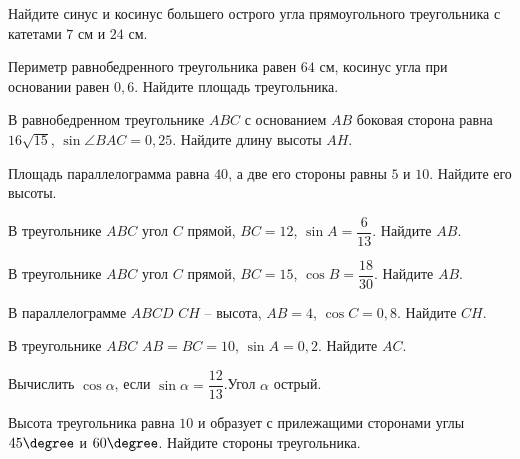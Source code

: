 \begin{class}[number=4]
\begin{listofex}[resume]
		\item Найдите синус и косинус  большего острого угла прямоугольного треугольника с катетами \( 7 \) см и \( 24  \) см.
		\item Периметр равнобедренного треугольника равен \( 64 \) см, косинус угла при основании равен \( 0,6 \). Найдите площадь треугольника.
		\item В равнобедренном треугольнике \( ABC \) с основанием \( AB \) боковая сторона равна \( 16\sqrt{15} \),  \( \sin\angle BAC=0,25 \). Найдите длину высоты \( AH \).
		\item Площадь параллелограмма равна \( 40 \), а две его стороны равны \( 5  \) и \( 10 \). Найдите его высоты.
	\end{listofex}
\end{class}

\begin{homework}[number=2]
	\begin{listofex}
		\item В треугольнике \( ABC \) угол \( C \) прямой, \( BC=12 \), \( \sin A=\dfrac{6}{13} \). Найдите \( AB \).
		\item В треугольнике \( ABC \) угол \( C \) прямой, \( BC=15 \), \( \cos B=\dfrac{18}{30} \). Найдите \( AB \).
		\item  В параллелограмме \( ABCD \) \( CH \) – высота, \( AB = 4 \), \( \cos C = 0,8 \). Найдите \( CH \).
		\item  В треугольнике \( ABC \) \( AB = BC = 10 \), \( \sin A = 0,2 \). Найдите \( AC \).
		\item Вычислить \( \cos \alpha \), если \( \sin \alpha =\dfrac{12}{13}\).Угол \( \alpha \) острый.
		\item  Высота треугольника равна \( 10 \) и образует с прилежащими сторонами углы \( 45\degree \) и \( 60\degree \). Найдите стороны треугольника.
	\end{listofex}
\end{homework}

